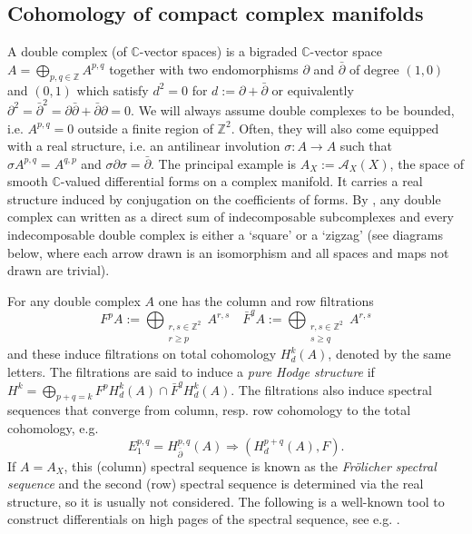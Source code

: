 \documentclass[12pt,reqno]{amsart}
\theoremstyle{definition}
\newcommand{\Z}{\mathbb{Z}}
\newcommand{\C}{\mathbb{C}}
\newcommand{\cA}{\mathcal{A}}
\newcommand{\del}{\partial}
\newcommand{\delbar}{\bar{\del}}
\begin{document}
\subsection{Cohomology of compact complex manifolds} \label{sec: cohm}
A double complex (of $\C$-vector spaces) is a bigraded $\C$-vector space $A=\bigoplus_{p,q\in\Z} A^{p,q}$ together with two endomorphisms $\del$ and $\delbar$ of degree $(1,0)$ and $(0,1)$ which satisfy $d^2=0$ for $d:=\del+\delbar$ or equivalently $\del^2=\delbar^2=\del\delbar+\delbar\del=0$. We will always assume double complexes to be bounded, i.e. $A^{p,q}=0$ outside a finite region of $\Z^2$. Often, they will also come equipped with a real structure, i.e. an antilinear involution $\sigma:A\to A$ such that $\sigma A^{p,q}=A^{q,p}$ and $\sigma\del\sigma=\delbar$. The principal example is $A_X:=\cA_X(X)$, the space of smooth $\C$-valued differential forms on a complex manifold. It carries a real structure induced by conjugation on the coefficients of forms. 
By \cite{KQ20, Ste21}, any double complex can written as a direct sum of indecomposable subcomplexes and every indecomposable double complex is either a `square' or a `zigzag' (see diagrams below, where each arrow drawn is an isomorphism and all spaces and maps not drawn are trivial).

For any double complex $A$ one has the column and row filtrations
\[
F^pA:=\bigoplus_{\substack{r,s\in\Z^2\\r\geq p}}A^{r,s}\quad \bar{F}^qA:=\bigoplus_{\substack{r,s\in\Z^2\\s\geq q}}A^{r,s}
\] and these induce filtrations on total cohomology $H_d^k(A)$, denoted by the same letters. The filtrations are said to induce a \textit{pure Hodge structure} if $H^k=\bigoplus_{p+q=k}F^pH^k_{d}(A)\cap\bar F^qH^k_d(A)$. The filtrations also induce spectral sequences that converge from column, resp. row cohomology to the total cohomology, e.g.
\[
E_1^{p,q}=H^{p,q}_{\delbar}(A)\Longrightarrow (H_{d}^{p+q}(A),F).
\]
If $A=A_X$, this (column) spectral sequence is known as the \textit{Fr\"olicher spectral sequence} and the second (row) spectral sequence is determined via the real structure, so it is usually not considered. The following is a well-known tool to construct differentials on high pages of the spectral sequence, see e.g. \cite{BT82, KQ20, Ste21}.
\end{document}
